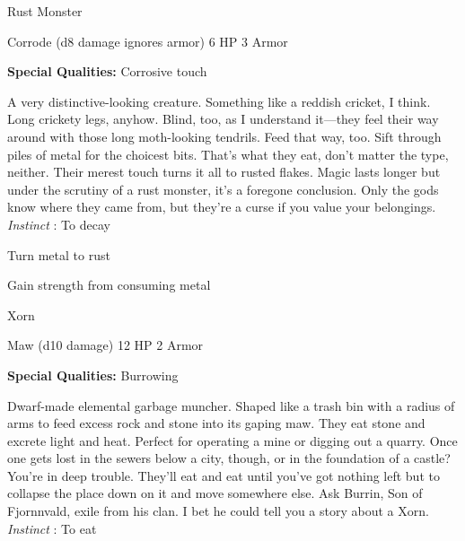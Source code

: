        
\stopitemize
       
\startMonsterName
Rust Monster	 
\stopMonsterName
       

Corrode (d8 damage ignores armor)	6 HP	3 Armor

       


       
\startMonsterQualities
         {\bf Special Qualities:}  Corrosive touch
\stopMonsterQualities
       
\startMonsterDescription
A very distinctive-looking creature. Something like a reddish cricket, I think. Long crickety legs, anyhow. Blind, too, as I understand it—they feel their way around with those long moth-looking tendrils. Feed that way, too. Sift through piles of metal for the choicest bits. That’s what they eat, don’t matter the type, neither. Their merest touch turns it all to rusted flakes. Magic lasts longer but under the scrutiny of a rust monster, it’s a foregone conclusion. Only the gods know where they came from, but they’re a curse if you value your belongings. {\em Instinct} : To decay
\stopMonsterDescription
       
\startitemize[1,packed]
         
\item Turn metal to rust

         
\item Gain strength from consuming metal

       
\stopitemize
       
\startMonsterName
Xorn	 
\stopMonsterName
       

Maw (d10 damage)	12 HP	2 Armor

       


       
\startMonsterQualities
         {\bf Special Qualities:}  Burrowing
\stopMonsterQualities
       
\startMonsterDescription
Dwarf-made elemental garbage muncher. Shaped like a trash bin with a radius of arms to feed excess rock and stone into its gaping maw. They eat stone and excrete light and heat. Perfect for operating a mine or digging out a quarry. Once one gets lost in the sewers below a city, though, or in the foundation of a castle? You’re in deep trouble. They’ll eat and eat until you’ve got nothing left but to collapse the place down on it and move somewhere else. Ask Burrin, Son of Fjornnvald, exile from his clan. I bet he could tell you a story about a Xorn. {\em Instinct} : To eat
\stopMonsterDescription
       
